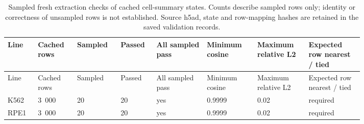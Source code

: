 \begin{longtable}{@{}L{0.07\linewidth}L{0.09\linewidth}L{0.09\linewidth}L{0.07\linewidth}L{0.12\linewidth}L{0.12\linewidth}L{0.12\linewidth}L{0.13\linewidth}@{}}
\caption{Sampled fresh extraction checks of cached cell-summary states. Counts describe sampled rows only; identity or correctness of unsampled rows is not established. Source h5ad, state and row-mapping hashes are retained in the saved validation records.}\\
\toprule
Line & Cached rows & Sampled & Passed & All sampled pass & Minimum cosine & Maximum relative L2 & Expected row nearest / tied \\
\midrule
\endfirsthead
\toprule
Line & Cached rows & Sampled & Passed & All sampled pass & Minimum cosine & Maximum relative L2 & Expected row nearest / tied \\
\midrule
\endhead
\endfoot
\bottomrule
\endlastfoot
K562 & 3~000 & 20 & 20 & yes & 0.9999 & 0.02 & required \\
RPE1 & 3~000 & 20 & 20 & yes & 0.9999 & 0.02 & required \\
\end{longtable}
